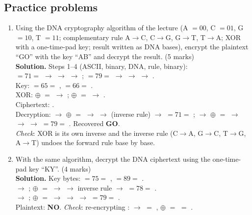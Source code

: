 \subsection*{Practice problems}
\begin{enumerate}[leftmargin=1.6em,itemsep=4pt]
  \item Using the DNA cryptography algorithm of the lecture (A $= 00$, C $= 01$, G $= 10$, T $= 11$; complementary rule A$\to$C, C$\to$G, G$\to$T, T$\to$A; XOR with a one-time-pad key; result written as DNA bases), encrypt the plaintext ``GO'' with the key ``AB'' and decrypt the result. \hfill (5 marks)\\
  \textbf{Solution.} Steps 1--4 (ASCII, binary, DNA, rule, binary):\\
   $= 71 = $  $\to$  $\to$  $\to$ ;\quad {} $= 79 = $  $\to$  $\to$  $\to$ .\\
  Key:  $= 65 = $ ,  $= 66 = $ .\\
  XOR:  $\oplus$  $= $  $\to$ ;\quad {} $\oplus$  $= $  $\to$ .\\
  Ciphertext: \textbf{}.\\
  Decryption:  $\to$  $\oplus$  $= $  $\to$  $\to$ (inverse rule)  $\to$  $= 71 = $ ;  $\to$  $\oplus$  $= $  $\to$  $\to$  $\to$  $= 79 = $ . Recovered \textbf{GO}.\\
  \emph{Check}: XOR is its own inverse and the inverse rule (C$\to$A, G$\to$C, T$\to$G, A$\to$T) undoes the forward rule base by base.

  \item With the same algorithm, decrypt the DNA ciphertext  using the one-time-pad key ``KY''. \hfill (4 marks)\\
  \textbf{Solution.} Key bytes:  $= 75 = $ ,  $= 89 = $ .\\
   $\to$ ; $\oplus$  $= $  $\to$  $\to$ inverse rule  $\to$  $= 78 = $ .\\
   $\to$ ; $\oplus$  $= $  $\to$  $\to$  $\to$  $= 79 = $ .\\
  Plaintext: \textbf{NO}. \emph{Check}: re-encrypting :  $\to$  $=$ , $\oplus$  $=$  $=$  \checkmark.


\end{enumerate}

